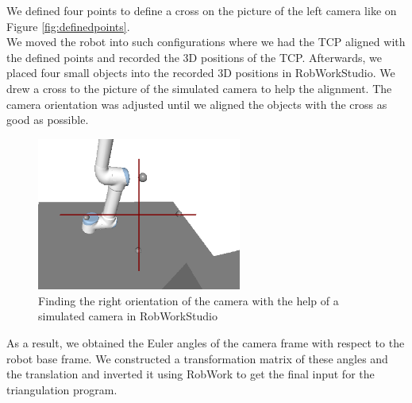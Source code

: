 We defined four points to define a cross on the picture of the left camera like on Figure \ref{fig:definedpoints}. \\

We moved the robot into such configurations where we had the TCP aligned with the defined points and recorded the 3D positions of the TCP. Afterwards, we placed four small objects into the recorded 3D positions in RobWorkStudio. We drew a cross to the picture of the simulated camera to help the alignment. The camera orientation was adjusted until we aligned the objects with the cross as good as possible.\\

\begin{figure}[ht!]
    \centering
    \includegraphics[width=0.6\textwidth]{Images/robwork_calib.png}
    \caption{Finding the right orientation of the camera with the help of a simulated camera in RobWorkStudio}
    \label{fig:robwork_calib}
\end{figure}

As a result, we obtained the Euler angles of the camera frame with respect to the robot base frame. We constructed a transformation matrix of these angles and the translation and inverted it using RobWork to get the final input for the triangulation program.